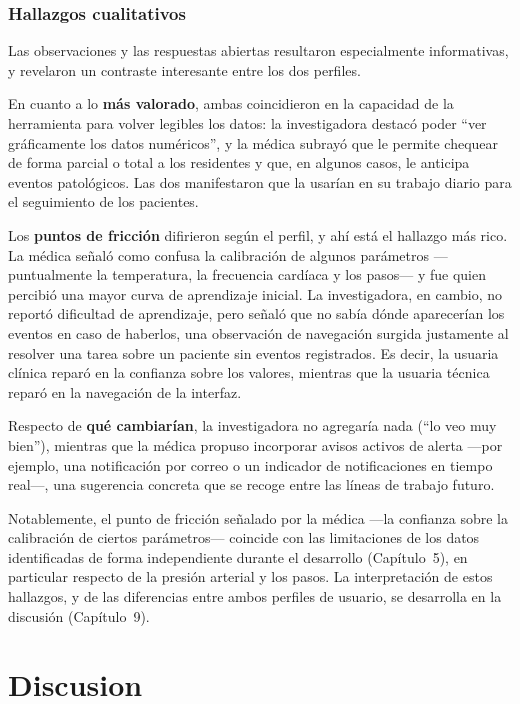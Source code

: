 \documentclass[12pt,a4paper]{article}
\begin{document}
    \subsubsection{Hallazgos cualitativos}
    Las observaciones y las respuestas abiertas resultaron especialmente informativas, y revelaron un contraste interesante entre los dos perfiles.

    En cuanto a lo \textbf{más valorado}, ambas coincidieron en la capacidad de la herramienta para volver legibles los datos: la investigadora destacó poder ``ver gráficamente los datos numéricos'', y la médica subrayó que le permite chequear de forma parcial o total a los residentes y que, en algunos casos, le anticipa eventos patológicos. Las dos manifestaron que la usarían en su trabajo diario para el seguimiento de los pacientes.

    Los \textbf{puntos de fricción} difirieron según el perfil, y ahí está el hallazgo más rico. La médica señaló como confusa la calibración de algunos parámetros —puntualmente la temperatura, la frecuencia cardíaca y los pasos— y fue quien percibió una mayor curva de aprendizaje inicial. La investigadora, en cambio, no reportó dificultad de aprendizaje, pero señaló que no sabía dónde aparecerían los eventos en caso de haberlos, una observación de navegación surgida justamente al resolver una tarea sobre un paciente sin eventos registrados. Es decir, la usuaria clínica reparó en la confianza sobre los valores, mientras que la usuaria técnica reparó en la navegación de la interfaz.

    Respecto de \textbf{qué cambiarían}, la investigadora no agregaría nada (``lo veo muy bien''), mientras que la médica propuso incorporar avisos activos de alerta —por ejemplo, una notificación por correo o un indicador de notificaciones en tiempo real—, una sugerencia concreta que se recoge entre las líneas de trabajo futuro.

    Notablemente, el punto de fricción señalado por la médica —la confianza sobre la calibración de ciertos parámetros— coincide con las limitaciones de los datos identificadas de forma independiente durante el desarrollo (Capítulo~5), en particular respecto de la presión arterial y los pasos. La interpretación de estos hallazgos, y de las diferencias entre ambos perfiles de usuario, se desarrolla en la discusión (Capítulo~9).
\newpage

\section{Discusion}
\end{document}
